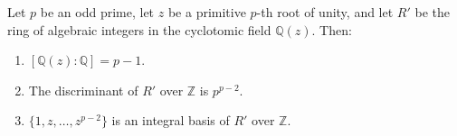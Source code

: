 Let $p$ be an odd prime, let $z$ be a primitive $p$-th root of unity, and let $R'$ be the ring of algebraic integers in the cyclotomic field $\mathbb{Q}(z)$. Then:
\begin{enumerate}
\item $[\mathbb{Q}(z) : \mathbb{Q}] = p - 1$.
\item The discriminant of $R'$ over $\mathbb{Z}$ is $p^{p-2}$.
\item $\{1, z, \ldots, z^{p-2}\}$ is an integral basis of $R'$ over $\mathbb{Z}$.
\end{enumerate}
